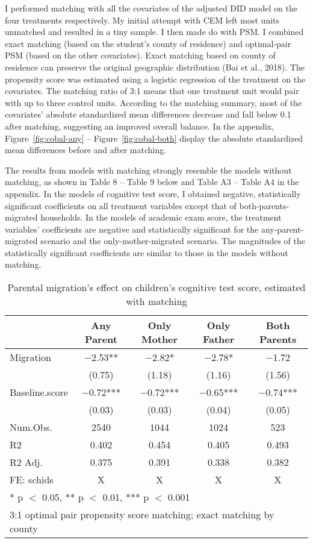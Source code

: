 \documentclass[
  man,floatsintext]{apa7}
\begin{document}
I performed matching with all the covariates of the adjusted DID model on the four treatments respectively. My initial attempt with CEM left most units unmatched and resulted in a tiny sample. I then made do with PSM. I combined exact matching (based on the student's county of residence) and optimal-pair PSM (based on the other covariates). Exact matching based on county of residence can preserve the original geographic distribution (Bai et al., 2018). The propensity score was estimated using a logistic regression of the treatment on the covariates. The matching ratio of 3:1 means that one treatment unit would pair with up to three control units. According to the matching summary, most of the covariates' absolute standardized mean differences decrease and fall below 0.1 after matching, suggesting an improved overall balance. In the appendix, Figure~\ref{fig:cobal-any} -- Figure~\ref{fig:cobal-both} display the absolute standardized mean differences before and after matching.

The results from models with matching strongly resemble the models without matching, as shown in Table 8 -- Table 9 below and Table A3 -- Table A4 in the appendix. In the models of cognitive test score, I obtained negative, statistically significant coefficients on all treatment variables except that of both-parents-migrated households. In the models of academic exam score, the treatment variables' coefficients are negative and statistically significant for the any-parent-migrated scenario and the only-mother-migrated scenario. The magnitudes of the statistically significant coefficients are similar to those in the models without matching.

\begin{table}

\caption{Parental migration’s effect on children’s cognitive test score, estimated with matching}
\centering
\begin{tabular}[t]{lcccc}
\toprule
  & Any Parent & Only Mother & Only Father & Both Parents\\
\midrule
Migration & \num{-2.53}** & \num{-2.82}* & \num{-2.78}* & \num{-1.72}\\
 & (\num{0.75}) & (\num{1.18}) & (\num{1.16}) & (\num{1.56})\\
Baseline.score & \num{-0.72}*** & \num{-0.72}*** & \num{-0.65}*** & \num{-0.74}***\\
 & (\num{0.03}) & (\num{0.03}) & (\num{0.04}) & (\num{0.05})\\
\midrule
Num.Obs. & \num{2540} & \num{1044} & \num{1024} & \num{523}\\
R2 & \num{0.402} & \num{0.454} & \num{0.405} & \num{0.493}\\
R2 Adj. & \num{0.375} & \num{0.391} & \num{0.338} & \num{0.382}\\
FE: schids & X & X & X & X\\
\bottomrule
\multicolumn{5}{l}{\rule{0pt}{1em}* p $<$ 0.05, ** p $<$ 0.01, *** p $<$ 0.001}\\
\multicolumn{5}{l}{\rule{0pt}{1em}3:1 optimal pair propensity score matching; exact matching by county}\\
\end{tabular}
\end{table}
\end{document}
